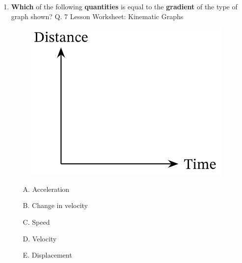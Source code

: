 \documentclass[A4,12pt]{article}
\begin{document}
\begin{enumerate}[label=\bfseries (\arabic*)]
\item \textbf{Which} of the following \textbf{quantities} is equal to the \textbf{gradient} of the type of graph shown? \cite{Nagwa} Q. 7 Lesson Worksheet: Kinematic Graphs

\begin{figure}[H]
    \centering
    \includegraphics{triguijoc.png}
    \caption{}
    \label{fig:my_label}
\end{figure}

\begin{itemize}
    \item[A.] Acceleration
    \item[B.] Change in velocity
    \item[C.] Speed
    \item[D.] Velocity
    \item[E.] Displacement
\end{itemize}













\end{enumerate}
\end{document}
